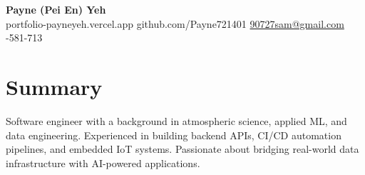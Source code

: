 \documentclass[10pt, a4paper]{article}
\begin{document}
\begin{center}
  {\huge\bfseries Payne (Pei En) Yeh}\\[3pt]
  {\small
    portfolio-payneyeh.vercel.app \enspace\textbar\enspace
    github.com/Payne721401 \enspace\textbar\enspace
    \href{mailto:90727sam@gmail.com}{90727sam@gmail.com} \enspace\textbar{}-581-713
  }
\end{center}\vspace{4pt}

\section{Summary}
Software engineer with a background in atmospheric science, applied ML, and data engineering. Experienced in building backend APIs, CI/CD automation pipelines, and embedded IoT systems. Passionate about bridging real-world data infrastructure with AI-powered applications.\vspace{-2pt}
\end{document}
